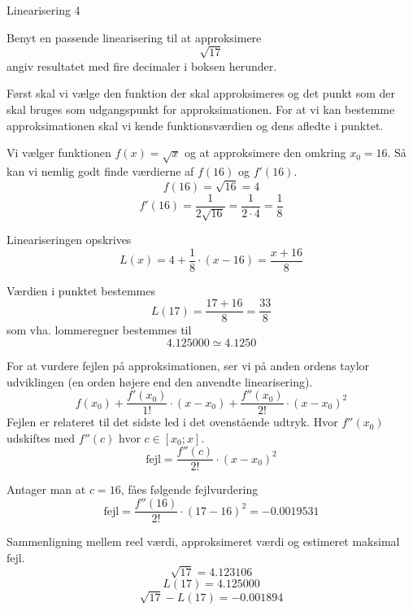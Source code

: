\documentclass{article}
\begin{document}
\begin{exercise}{Linearisering 4}

Benyt en passende linearisering til at approksimere
\[
\sqrt{17}
\]
angiv resultatet med fire decimaler i boksen herunder.

\hint
Først skal vi vælge den funktion der skal approksimeres
og det punkt som der skal bruges som udgangspunkt for
approksimationen.
For at vi kan bestemme approksimationen skal vi
kende funktionsværdien og dens afledte i punktet.

\hint
Vi vælger funktionen $f(x) = \sqrt{x}$ og at approksimere den
omkring $x_0 = 16$.
Så kan vi nemlig godt finde værdierne af $f(16)$ og $f'(16)$.
\[
f(16) = \sqrt{16} = 4
\]
\[
f'(16) = \frac{1}{2 \sqrt{16}} = \frac{1}{2 \cdot 4 } = \frac{1}{8}
\]

\hint
Lineariseringen opskrives
\[
L(x) = 4 + \frac{1}{8} \cdot (x - 16) = \frac{x + 16}{8}
\]

\hint
Værdien i punktet bestemmes
\[
L(17) = \frac{17 + 16}{8} = \frac{33}{8}
\]
som vha. lommeregner bestemmes til
\[
4.125000 \simeq 4.1250
\]

\hint
For at vurdere fejlen på approksimationen, ser vi på anden
ordens taylor udviklingen (en orden højere end den
anvendte linearisering).
\[
f(x_0)
+ \frac{f'(x_0)}{1!} \cdot (x - x_0)
+ \frac{f''(x_0)}{2!} \cdot (x - x_0)^2
\]
Fejlen er relateret til det sidste led i det ovenstående udtryk.
Hvor $f''(x_0)$ udskiftes med $f''(c)$ hvor $c \in [x_0; x]$.
\[
\textrm{fejl} = \frac{f''(c)}{2!} \cdot (x - x_0)^2
\]

\hint
Antager man at $c = 16$, fåes følgende fejlvurdering
\[
\textrm{fejl} = \frac{f''(16)}{2!} \cdot (17 - 16)^2 =
-0.0019531\]

\hint
Sammenligning mellem reel værdi, approksimeret værdi og estimeret maksimal fejl.
\[
\sqrt{17}= 4.123106
\]
\[
L(17) = 4.125000
\]
\[
\sqrt{17} - L(17) = -0.001894
\]

\end{exercise}
\end{document}
